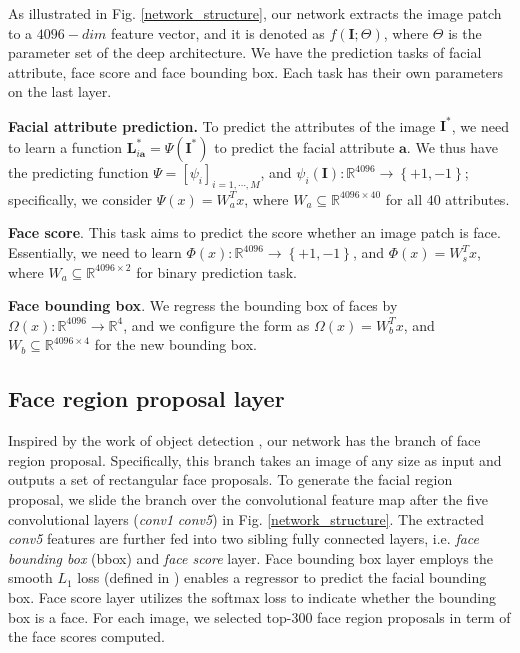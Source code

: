 \documentclass[10pt,twocolumn,letterpaper]{article}
\begin{document}
As illustrated in Fig. \ref{network_structure}, our network extracts
the image patch to a $4096-dim$ feature vector, and it is denoted
as $f\left(\mathbf{I};\Theta\right)$, where $\Theta$ is the parameter
set of the deep architecture. We have the prediction tasks of facial
attribute, face score and face bounding box. Each task has their own
parameters on the last layer.

\vspace{0.05in}

\noindent \textbf{Facial attribute prediction.} To predict the attributes
of the image $\mathbf{I}^{*}$, we need to learn a function $\mathbf{L}_{i\mathbf{a}}^{*}=\Psi\left(\mathbf{I}^{*}\right)$
to predict the facial attribute $\mathbf{a}$. We thus have the predicting
function $\Psi=\left[\psi_{i}\right]_{i=1,\cdots,M}$, and $\psi_{i}\left(\mathbf{I}\right):\mathbb{R}^{4096}\rightarrow\left\{ +1,-1\right\} $;
specifically, we consider $\Psi\left(x\right)=W_{a}^{T}x$, where
$W_{a}\subseteq\mathbb{R}^{4096\times40}$ for all $40$ attributes.

\vspace{0.05in}

\noindent \textbf{Face score}. This task aims to predict the score
whether an image patch is face. Essentially, we need to learn $\Phi\left(x\right):\mathbb{R}^{4096}\rightarrow\left\{ +1,-1\right\} $,
and $\Phi\left(x\right)=W_{s}^{T}x$, where $W_{a}\subseteq\mathbb{R}^{4096\times2}$
for binary prediction task.

\vspace{0.05in}

\noindent \textbf{Face bounding box}. We regress the bounding box
of faces by $\Omega\left(x\right):\mathbb{R}^{4096}\rightarrow\mathbb{R}^{4}$,
and we configure the form as $\Omega\left(x\right)=W_{b}^{T}x$, and
$W_{b}\subseteq\mathbb{R}^{4096\times4}$ for the new bounding box.

\subsection{Face region proposal layer \label{subsec:Face-Region-proposal}}

Inspired by the work of object detection \cite{faster_rcnn}, our
network has the branch of face region proposal. Specifically, this
branch takes an image of any size as input and outputs a set of rectangular
face proposals. To generate the facial region proposal, we slide the
branch over the convolutional feature map after the five convolutional
layers (\emph{conv1}\textendash{} \emph{conv5}) in Fig. \ref{network_structure}.
The extracted \emph{conv5} features are further fed into two sibling
fully connected layers, i.e. \emph{face bounding box} (bbox) and \emph{face
score} layer. Face bounding box layer employs the smooth $L_{1}$
loss (defined in \cite{fast_rcnn}) enables a regressor to predict
the facial bounding box. Face score layer utilizes the softmax loss
to indicate whether the bounding box is a face. For each image, we
selected top-300 face region proposals in term of the face scores
computed.
\end{document}
